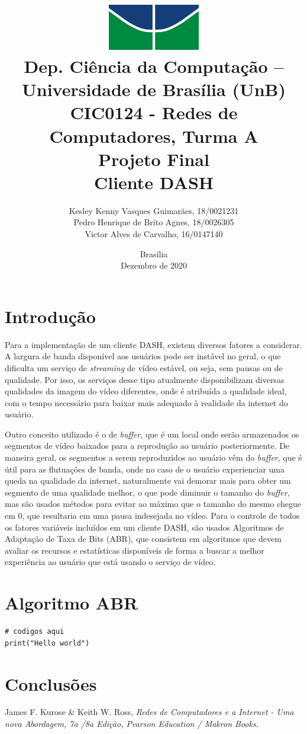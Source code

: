 \documentclass[12pt]{article}
\title{
        \includegraphics[width=4cm]{img/logo.jpg} \\ 
        \large
        Dep. Ciência da Computação -- Universidade de Brasília (UnB)\\
        CIC0124 - Redes de Computadores, Turma A \\
        \vfill 
        \vfill
        \LARGE
        \textbf{Projeto Final\\
        Cliente DASH}
        \vfill
    }
\author{
        Kesley Kenny Vasques Guimarães, 18/0021231\\
        Pedro Henrique de Brito Agnes, 18/0026305\\
        Victor Alves de Carvalho, 16/0147140
    }
\affil{
        \vfill
        \vfill
        \vfill
        Professor \\
        Dr. Marcos Fagundes Caetano
    }
\date{Brasília\\Dezembro de 2020}
\begin{document}
\maketitle
\newpage


\section{Introdução}
Para a implementação de um cliente DASH, existem diversos fatores a considerar. A largura de banda disponível aos usuários pode ser instável no geral, o que dificulta um serviço de \textit{streaming} de vídeo estável, ou seja, sem pausas ou de qualidade. Por isso, os serviços desse tipo atualmente disponibilizam diversas qualidades da imagem do vídeo diferentes, onde é atribuída a qualidade ideal, com o tempo necessário para baixar mais adequado à realidade da internet do usuário.

Outro conceito utilizado é o de \textit{buffer}, que é um local onde serão armazenados os segmentos de vídeo baixados para a reprodução ao usuário posteriormente. De maneira geral, os segmentos a serem reproduzidos ao usuário vêm do \textit{buffer}, que é útil para as flutuações de banda, onde no caso de o usuário experienciar uma queda na qualidade da internet, naturalmente vai demorar mais para obter um segmento de uma qualidade melhor, o que pode diminuir o tamanho do \textit{buffer}, mas são usados métodos para evitar ao máximo que o tamanho do mesmo chegue em 0, que resultaria em uma pausa indesejada no vídeo. Para o controle de todos os fatores variáveis incluídos em um cliente DASH, são usados Algoritmos de Adaptação de Taxa de Bits (ABR), que consistem em algoritmos que devem avaliar os recursos e estatísticas disponíveis de forma a buscar a melhor experiência ao usuário que está usando o serviço de vídeo.

\newpage

\section{Algoritmo ABR}
\lipsum[1]

\begin{lstlisting}
# codigos aqui
print("Hello world")
\end{lstlisting}

\section{Conclusões}
\lipsum[3]

\lipsum[5]

\lipsum[10]

\begin{thebibliography}{9}

\noindent James F. Kurose \& Keith W. Ross, 
\textit{Redes de Computadores e a Internet - Uma nova Abordagem, 7a /8a Edição, Pearson Education / Makron Books.}

\end{thebibliography}
\end{document}
